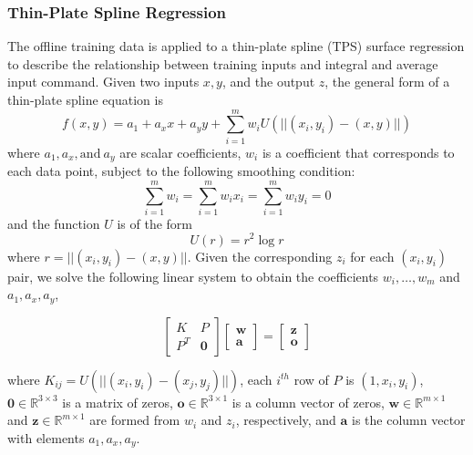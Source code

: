 \documentclass[letterpaper, 10 pt, conference]{ieeeconf}  %
\newcommand\NB[1]{$\spadesuit$\footnote{NB: #1}}
\begin{document}
\subsubsection{Thin-Plate Spline Regression}

The offline training data is applied to a thin-plate spline (TPS) surface regression to describe the relationship between training inputs and integral and average input command. Given two inputs $x,y$, and the output $z$, the general form of a thin-plate spline equation is 
\begin{equation}
    f(x,y) = a_1 + a_xx + a_yy + \sum_{i=1}^mw_iU(||(x_i,y_i)-(x,y)||)
\end{equation}
where $a_1,a_x,\text{and}~a_y$ are scalar coefficients, $w_i$ is a coefficient that corresponds to each data point, subject to the following smoothing condition: \begin{equation}
\sum_{i=1}^mw_i=\sum_{i=1}^mw_ix_i=\sum_{i=1}^mw_iy_i=0
\end{equation}
and the function $U$ is of the form
\begin{equation}
  U(r) = r^2\log{r} 
\end{equation}
where $r=||(x_i,y_i)-(x,y)||$.
Given the corresponding $z_i$ for each $(x_i,y_i)$ pair, we solve the following linear system to obtain the coefficients $w_i,\ldots,w_m$ and $a_1,a_x,a_y$,

\begin{equation}
    \begin{bmatrix}
    K&P\\
    P^T& \bm{0}
    \end{bmatrix}
    \begin{bmatrix}
    \bm{w}\\
    \bm{a}
    \end{bmatrix} = 
    \begin{bmatrix}
    \bm{z}\\
    \bm{o}
    \end{bmatrix}
\end{equation}

where $K_{ij} = U(||(x_i,y_i)-(x_j,y_j)||)$, each $i^{th}$ row of $P$ is $(1,x_i,y_i)$, $\bm{0}  \in \mathbb{R}^{3\times3}$ is a matrix of zeros, $\bm{o} \in \mathbb{R}^{3\times1}$ is a column vector of zeros, $\bm{w} \in \mathbb{R}^{m\times1}$ and $\bm{z} \in \mathbb{R}^{m\times1}$ are formed from $w_i$ and $z_i$, respectively, and $\bm{a}$ is the column vector with elements $a_1,a_x,a_y$.
\end{document}
